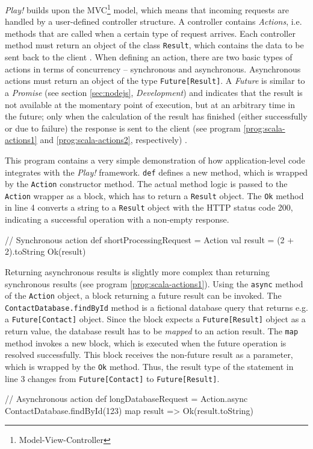 \textit{Play!} builds upon the MVC\footnote{Model-View-Controller} model, which means that incoming requests are handled by a user-defined controller structure. A controller contains \textit{Actions}, i.e. methods that are called when a certain type of request arrives. Each controller method must return an object of the class \texttt{Result}, which contains the data to be sent back to the client \cite[p. 27]{Reelsen2011}. When defining an action, there are two basic types of actions in terms of concurrency -- synchronous and asynchronous. Asynchronous actions must return an object of the type \texttt{Future[Result]}. A \textit{Future} is similar to a \textit{Promise} (see section \ref{sec:nodejs}, \textit{Development}) and indicates that the result is not available at the momentary point of execution, but at an arbitrary time in the future; only when the calculation of the result has finished (either successfully or due to failure) the response is sent to the client (see program \ref{prog:scala-actions1} and \ref{prog:scala-actions2}, respectively) \cite[p. 86]{Scala}. 

\begin{program}
  \caption{This program contains a very simple demonstration of how application-level code integrates with the \textit{Play!} framework. \texttt{def} defines a new method, which is wrapped by the \texttt{Action} constructor method. The actual method logic is passed to the \texttt{Action} wrapper as a block, which has to return a \texttt{Result} object. The \texttt{Ok} method in line 4 converts a string to a \texttt{Result} object with the HTTP status code 200, indicating a successful operation with a non-empty response.}
  \label{prog:scala-actions1}
  \begin{JavaCode}
// Synchronous action
def shortProcessingRequest = Action {
    val result = (2 + 2).toString
    Ok(result)
}
  \end{JavaCode}
\end{program}
\begin{program}
  \caption{Returning asynchronous results is slightly more complex than returning synchronous results (see program \ref{prog:scala-actions1}). Using the \texttt{async} method of the \texttt{Action} object, a block returning a future result can be invoked. The \texttt{ContactDatabase.findById} method is a fictional database query that returns e.g. a \texttt{Future[Contact]} object. Since the block expects a \texttt{Future[Result]} object as a return value, the database result has to be \textit{mapped} to an action result. The \texttt{map} method invokes a new block, which is executed when the future operation is resolved successfully. This block receives the non-future result as a parameter, which is wrapped by the \texttt{Ok} method. Thus, the result type of the statement in line 3 changes from \texttt{Future[Contact]} to \texttt{Future[Result]}.}
  \label{prog:scala-actions2}
  \begin{JavaCode}
// Asynchronous action
def longDatabaseRequest = Action.async {
    ContactDatabase.findById(123) map {
        result =>
            Ok(result.toString)
    }
}
  \end{JavaCode}
\end{program}

